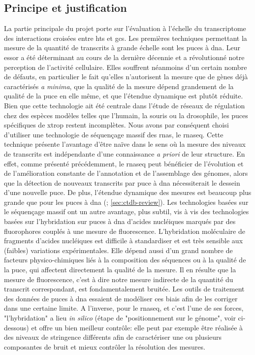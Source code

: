 \documentclass[../main.tex]{subfiles}
\begin{document}
\subsection{Principe et justification}
La partie principale du projet porte sur l'évaluation à l'échelle du transcriptome des interactions croisées entre \glspl{ht} et \glspl{gc}.
Les premières techniques permettant la mesure de la quantité de transcrits à grande échelle sont les puces à \gls{dna}.
Leur essor a été déterminant au cours de la dernière décennie et a révolutionné notre perception de l'activité cellulaire.
Elles souffrent néanmoins d'un certain nombre de défauts, en particulier le fait qu'elles n'autorisent la mesure que de gènes déjà caractérisés \textit{a minima}, que la qualité de la mesure dépend grandement de la qualité de la puce en elle même, et que l'étendue dynamique est plutôt réduite.
Bien que cette technologie ait été centrale dans l'étude de réseaux de régulation chez des espèces modèles telles que l'humain, la souris ou la drosophile, les puces spécifiques de \gls{xtrop} restent incomplètes.
Nous avons par conséquent choisi d'utiliser une technologie de séquençage massif des \glspl{rna}, le \gls{rnaseq}.
Cette technique présente l'avantage d'être naïve dans le sens où la mesure des niveaux de transcrits est indépendante d'une connaissance \textit{a priori} de leur structure.
En effet, comme présenté précédemment, le \gls{rnaseq} peut bénéficier de l'évolution et de l'amélioration constante de l'annotation et de l'assemblage des génomes, alors que la détection de nouveaux transcrits par puce à \gls{dna} nécessiterait le dessein d'une nouvelle puce.
De plus, l'étendue dynamique des mesures est beaucoup plus grande que pour les puces à \gls{dna} (\citealp{Grimaldi2013}; \autoref{sec:ctdb-review}).
Les technologies basées sur le séquençage massif ont un autre avantage, plus subtil, vis à vis des technologies basées sur l'hybridation sur puces à \gls{dna} d'acides nucléiques marqués par des fluorophores couplés à une mesure de fluorescence.
L'hybridation moléculaire de fragments d'acides nucléiques est difficile à standardiser et est très sensible aux (faibles) variations expérimentales.
Elle dépend aussi d'un grand nombre de facteurs physico-chimiques liés à la composition des séquences ou à la qualité de la puce, qui affectent directement la qualité de la mesure.
Il en résulte que la mesure de fluorescence, c'est à dire notre mesure indirecte de la quantité du transcrit correspondant, est fondamentalement bruitée.
Les outils de traitement des données de puces à \gls{dna} essaient de modéliser ces biais afin de les corriger dans une certaine limite.
A l'inverse, pour le \gls{rnaseq}, et c'est l'une de ses forces, "l'hybridation" a lieu \textit{in silico} (étape de "positionnement sur le génome", voir ci-dessous) et offre un bien meilleur contrôle: elle peut par exemple être réalisée à des niveaux de stringence différents afin de caractériser une ou plusieurs composantes de bruit et mieux contrôler la résolution des mesures.
\end{document}

